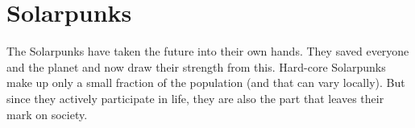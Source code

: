 \section{Solarpunks}

The Solarpunks have taken the future into their own hands. They saved everyone and the planet and now draw their strength from this.
Hard-core Solarpunks make up only a small fraction of the population (and that can vary locally). But since they actively participate in life, they are also the part that leaves their mark on society.
